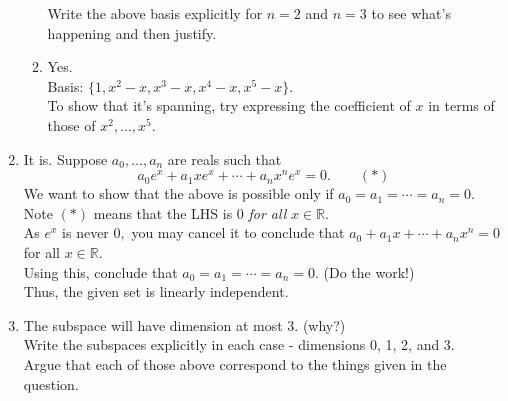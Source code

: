 \documentclass{article}
\begin{document}
\begin{enumerate}
\begin{enumerate}
		Write the above basis explicitly for $n = 2$ and $n = 3$ to see what's happening and then justify.
		\item Yes.\\
		Basis: $\{1, x^2-x, x^3-x, x^4-x, x^5-x\}.$\\
		To show that it's spanning, try expressing the coefficient of $x$ in terms of those of $x^2,\ldots, x^5.$
	\end{enumerate}
	\item It is. Suppose $a_0,\ldots, a_n$ are reals such that
	\[a_0e^x + a_1xe^x + \cdots + a_nx^ne^x = 0. \qquad (*)\]
	We want to show that the above is possible only if $a_0 = a_1 = \cdots = a_n = 0.$\\
	Note $(*)$ means that the LHS is $0$ \emph{for all} $x \in \mathbb{R}.$\\
	As $e^x$ is never $0,$ you may cancel it to conclude that $a_0 + a_1x + \cdots + a_nx^n = 0$ for all $x \in \mathbb{R}.$\\
	Using this, conclude that $a_0 = a_1 = \cdots = a_n = 0.$ \hfill (Do the work!)\\
	Thus, the given set is linearly independent.
	\item The subspace will have dimension at most 3. (why?)\\
	Write the subspaces explicitly in each case - dimensions 0, 1, 2, and 3.\\
	Argue that each of those above correspond to the things given in the question.  
\end{enumerate}
\end{document}
